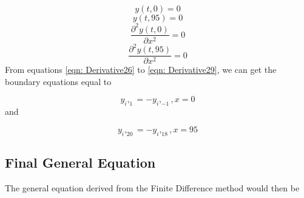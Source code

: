 \documentclass[conference]{IEEEtran}
\begin{document}
	\begin{equation}
		\label{eqn: Derivative26}
		{y(t,0) = 0}
	\end{equation} 
	\begin{equation}
		\label{eqn: Derivative27}
		{y(t,95) = 0}
	\end{equation} 
	\begin{equation}
		\label{eqn: Derivative28}
		\frac{\partial^2 y(t,0)}{\partial x^2}  = 0
	\end{equation} 
	\begin{equation}
		\label{eqn: Derivative29}
		\frac{\partial^2 y(t,95)}{\partial x^2}  = 0
	\end{equation} 
	From equations \eqref{eqn: Derivative26} to \eqref{eqn: Derivative29}, we can get the boundary equations equal to
	
	\begin{equation}
		\label{eqn: Derivative30}
		{y_{i},_{1} = - y_{i},_{-1}, x = 0}  
	\end{equation}  
	and
	
	\begin{equation}
		\label{eqn: Derivative31}
		{y_{i},_{20} = - y_{i},_{18}, x = 95}  
	\end{equation}  

	\subsection{Final General Equation}
	
	The general equation derived from the Finite Difference method would then be 
	
\end{document}
